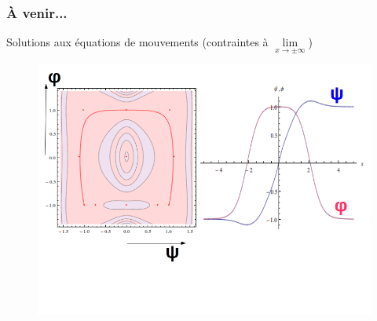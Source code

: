\documentclass[handout]{beamer}
\begin{document}
\begin{frame}\frametitle{À venir...}
Solutions aux équations de mouvements (contraintes à $\lim\limits_{x \to \pm\infty}$)

  \begin{figure}
     \includegraphics[scale=0.35]{collageener.png}
    \end{figure}
%
%
    
\end{frame}
\end{document}
